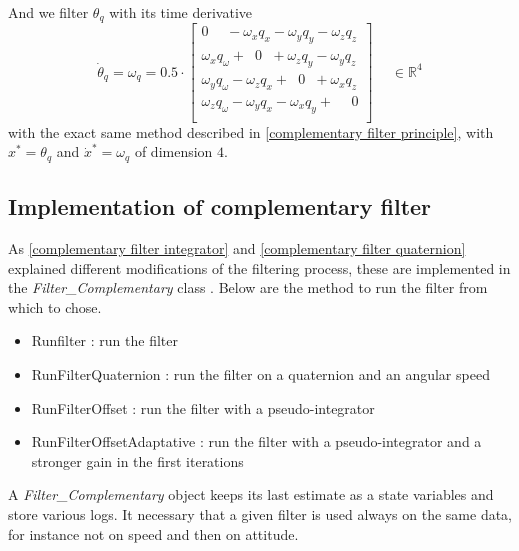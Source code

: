 \documentclass[a4paper,10pt]{article}
\begin{document}
And we filter $\theta_q$ with its time derivative \cite{Quat_derivative}
$$ \dot \theta_q = \omega_q = 0.5 \cdot \begin{bmatrix}  
 0 \hspace{15pt}  -  \omega_x q_x    -   \omega_y q_y   -   \omega_z q_z\\
\omega_x q_\omega + \hspace{7pt} 0 \hspace{7pt} + \omega_z q_y - \omega_y q_z\\
\omega_y q_\omega - \omega_z q_x + \hspace{7pt} 0 \hspace{7pt} + \omega_x q_z \\   
\omega_z q_\omega - \omega_y q_x - \omega_x q_y + \hspace{15pt} 0 \\   

    \end{bmatrix} \hspace{15pt} \in\mathbb{R}^4$$
with the exact same method described in \ref{complementary filter principle}, with $x^* = \theta_q$ and $ \dot x^* = \omega_q$ of dimension $4$.

\subsection{Implementation of complementary filter}

As \ref{complementary filter integrator} and \ref{complementary filter quaternion} explained different modifications of the filtering process, these are implemented in the \textit{Filter\_Complementary} class \cite{Git_NAlbrecht}. Below are the method to run the filter from which to chose.

\begin{itemize}
	\item Runfilter : run the filter
	\item RunFilterQuaternion : run the filter on a quaternion and an angular speed
	\item RunFilterOffset : run the filter with a pseudo-integrator
	\item RunFilterOffsetAdaptative : run the filter with a pseudo-integrator and a stronger gain in the first iterations
\end{itemize}

A \textit{Filter\_Complementary} object keeps its last estimate as a state variables and store various logs. It necessary that a given filter is used always on the same data, for instance not on speed and then on attitude. 
\end{document}
